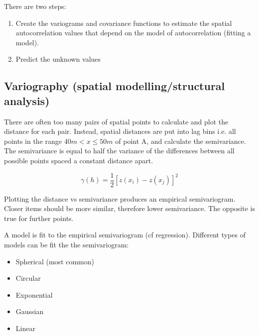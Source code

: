 \documentclass{article}
\begin{document}
There are two steps:

\begin{enumerate}
    \item Create the variograms and covariance functions to estimate the spatial autocorrelation values that depend on the model of autocorrelation (fitting a model).
    \item Predict the unknown values
\end{enumerate}

\subsection{Variography (spatial modelling/structural analysis)}

There are often too many pairs of spatial points to calculate and plot the distance for each pair.
Instead, spatial distances are put into lag bins i.e. all points in the range $40m < x \le 50m$ of point A, and calculate the semivariance.
The semivariance is equal to half the variance of the differences between all possible points spaced a constant distance apart.

\[\gamma (h) = \frac{1}{2}[z(x_{i}) - z(x_{j})]^2\]

Plotting the distance vs semivariance produces an empirical semivariogram.
Closer items should be more similar, therefore lower semivariance.
The opposite is true for further points.

A model is fit to the empirical semivariogram (cf regression).
Different types of models can be fit the the semivariogram:

\begin{itemize}
    \item Spherical (most common)
    \item Circular
    \item Exponential
    \item Gaussian
    \item Linear
\end{itemize}
\end{document}
